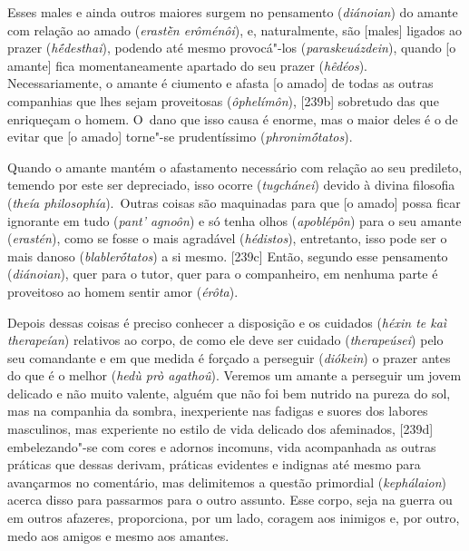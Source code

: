 Esses males e ainda outros maiores surgem no pensamento
(\emph{diánoian}) do amante com relação ao amado (\emph{erastḕn
erôménôi}), e, naturalmente, são [males] ligados ao prazer
(\emph{hḗdesthai}), podendo até mesmo provocá"-los
(\emph{paraskeuázdein}), quando [o amante] fica momentaneamente
apartado do seu prazer (\emph{hêdéos}). Necessariamente, o amante é
ciumento e afasta [o amado] de todas as outras companhias que lhes
sejam proveitosas (\emph{ôphelímôn}), [239b] sobretudo das que
enriqueçam o homem. O~dano que isso causa é enorme, mas o maior deles é
o de evitar que [o amado] torne"-se prudentíssimo
(\emph{phronimṓtatos}).

Quando o amante mantém o afastamento necessário com relação ao seu
predileto, temendo por este ser depreciado, isso ocorre
(\emph{tugchánei}) devido à divina filosofia (\emph{theía
philosophía}).~Outras coisas são maquinadas para que [o amado] possa
ficar ignorante em tudo (\emph{pant' agnoôn}) e só tenha olhos
(\emph{apoblépôn}) para o seu amante (\emph{erastén}), como se fosse o
mais agradável (\emph{hédistos}), entretanto, isso pode ser o mais danoso
(\emph{blablerṓtatos}) a si mesmo. [239c] Então, segundo esse
pensamento (\emph{diánoian}), quer para o tutor, quer para o
companheiro, em nenhuma parte é proveitoso ao homem sentir amor
(\emph{érôta}).

Depois dessas coisas é preciso conhecer a disposição e os cuidados
(\emph{héxin te kaì therapeían}) relativos ao corpo, de como ele deve
ser cuidado (\emph{therapeúsei}) pelo seu comandante e em que medida é
forçado a perseguir (\emph{diókein}) o prazer antes do que é o melhor
(\emph{hedù prò agathoû}). Veremos um amante a perseguir um jovem
delicado e não muito valente, alguém que não foi bem nutrido na pureza
do sol, mas na companhia da sombra, inexperiente nas fadigas e suores
dos labores masculinos, mas experiente no estilo de vida delicado dos
afeminados, [239d] embelezando"-se com cores e adornos incomuns, vida
acompanhada as outras práticas que dessas derivam, práticas evidentes e
indignas até mesmo para avançarmos no comentário, mas delimitemos a
questão primordial (\emph{kephálaion}) acerca disso para passarmos para
o outro assunto. Esse corpo, seja na guerra ou em outros afazeres,
proporciona, por um lado, coragem aos inimigos e, por outro, medo aos
amigos e mesmo aos amantes.

